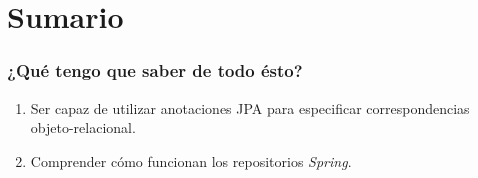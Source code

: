 \documentclass[a4paper,slidestop,xcolor=pst,blue]{beamer}
\begin{document}
\section{Sumario}

\begin{frame}[c]
    \frametitle{¿Qué tengo que saber de todo ésto?}
    \begin{enumerate}[<+->]
        \item Ser capaz de utilizar anotaciones JPA para especificar correspondencias objeto-relacional.
        \item Comprender cómo funcionan los repositorios \emph{Spring}.
    \end{enumerate}
\end{frame}
\end{document}
